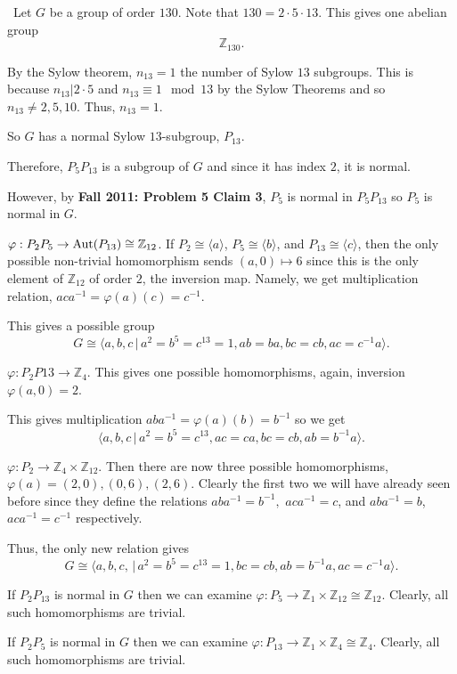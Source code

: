 \documentclass[12pt]{Qual}
\begin{document}
\begin{solution}$\,$
Let $G$ be a group of order $130.$ Note that $130=2\cdot 5\cdot 13$. This gives one abelian group $$\mathbb{Z}_{130}.$$

By the Sylow theorem, $n_{13}=1$ the number of Sylow $13$ subgroups. This is because $n_{13}|2\cdot 5$ and $n_{13}\equiv 1\mod 13$ by the Sylow Theorems and so $n_{13}\not=2,5,10.$ Thus, $n_{13}=1.$

So $G$ has a normal Sylow $13$-subgroup, $P_{13}$.

Therefore, $P_5P_{13}$ is a subgroup of $G$ and since it has index $2$, it is normal.

However, by \textbf{Fall 2011: Problem 5 Claim 3}, $P_5$ is normal in $P_5P_{13}$ so $P_5$ is normal in $G$.

 $\varphi: P_2P_5\to\text{Aut}(P_{13})\cong \mathbb{Z}_{12}$. If $P_2\cong\langle a\rangle$, $P_5\cong\langle b\rangle$, and $P_{13}\cong\langle c\rangle$, then the only possible non-trivial homomorphism sends $(a,0)\mapsto 6$ since this is the only element of $\mathbb{Z}_{12}$ of order $2$, the inversion map. Namely, we get multiplication relation, $aca^{-1}=\varphi(a)(c)=c^{-1}$.

This gives a possible group $$G\cong\langle a,b,c\,|\,a^2=b^5=c^{13}=1,ab=ba,bc=cb,ac=c^{-1}a\rangle.$$

 $\varphi:P_2P{13}\to \mathbb{Z}_4$. This gives one possible homomorphisms, again, inversion $\varphi(a,0)=2$.

This gives multiplication $aba^{-1}=\varphi(a)(b)=b^{-1}$ so we get $$\langle a,b,c\,|\,a^2=b^5=c^{13},ac=ca,bc=cb,ab=b^{-1}a\rangle.$$

 $\varphi:P_2\to \mathbb{Z}_4\times\mathbb{Z}_{12}$. Then there are now three possible homomorphisms, $\varphi(a)=(2,0),(0,6),(2,6)$. Clearly the first two we will have already seen before since they define the relations $aba^{-1}=b^{-1},$ $aca^{-1}=c$, and $aba^{-1}=b$, $aca^{-1}=c^{-1}$ respectively.

Thus, the only new relation gives $$G\cong\langle a,b,c,\,|\,a^2=b^5=c^{13}=1,bc=cb,ab=b^{-1}a,ac=c^{-1}a\rangle.$$

 If $P_2P_{13}$ is normal in $G$ then we can examine $\varphi:P_5\to \mathbb{Z}_1\times\mathbb{Z}_{12}\cong\mathbb{Z}_{12}$. Clearly, all such homomorphisms are trivial.

 If $P_2P_5$ is normal in $G$ then we can examine $\varphi:P_{13}\to \mathbb{Z}_1\times\mathbb{Z}_4\cong\mathbb{Z}_4$. Clearly, all such homomorphisms are trivial.


\end{solution}
\end{document}
